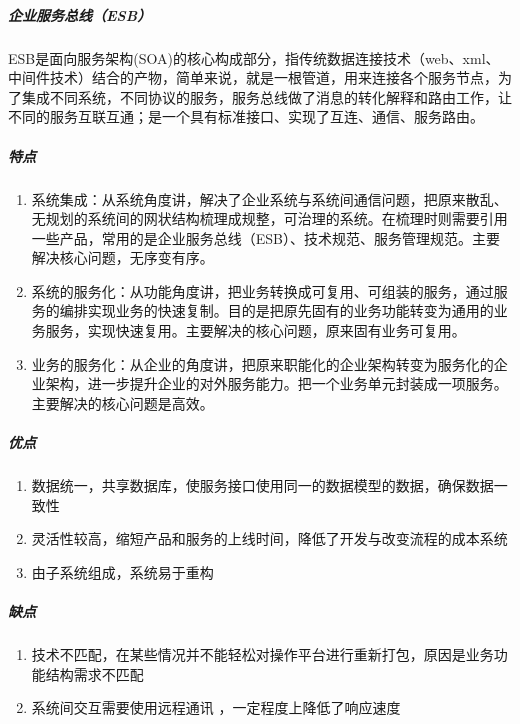 \documentclass[letterpaper,11pt,english]{sphinxmanual}
\begin{document}
\subparagraph{企业服务总线（ESB）}
\label{\detokenize{chapter_idea/understand_tech:esb}}
ESB是面向服务架构(SOA)的核心构成部分，指传统数据连接技术（web、xml、中间件技术）结合的产物，简单来说，就是一根管道，用来连接各个服务节点，为了集成不同系统，不同协议的服务，服务总线做了消息的转化解释和路由工作，让不同的服务互联互通；是一个具有标准接口、实现了互连、通信、服务路由。


\subparagraph{特点}
\label{\detokenize{chapter_idea/understand_tech:id20}}\begin{enumerate}
%
\item {} 
系统集成：从系统角度讲，解决了企业系统与系统间通信问题，把原来散乱、无规划的系统间的网状结构梳理成规整，可治理的系统。在梳理时则需要引用一些产品，常用的是企业服务总线（ESB）、技术规范、服务管理规范。主要解决核心问题，无序变有序。

\item {} 
系统的服务化：从功能角度讲，把业务转换成可复用、可组装的服务，通过服务的编排实现业务的快速复制。目的是把原先固有的业务功能转变为通用的业务服务，实现快速复用。主要解决的核心问题，原来固有业务可复用。

\item {} 
业务的服务化：从企业的角度讲，把原来职能化的企业架构转变为服务化的企业架构，进一步提升企业的对外服务能力。把一个业务单元封装成一项服务。主要解决的核心问题是高效。

\end{enumerate}


\subparagraph{优点}
\label{\detokenize{chapter_idea/understand_tech:id21}}\begin{enumerate}
%
\item {} 
数据统一，共享数据库，使服务接口使用同一的数据模型的数据，确保数据一致性

\item {} 
灵活性较高，缩短产品和服务的上线时间，降低了开发与改变流程的成本系统

\item {} 
由子系统组成，系统易于重构

\end{enumerate}


\subparagraph{缺点}
\label{\detokenize{chapter_idea/understand_tech:id22}}\begin{enumerate}
%
\item {} 
技术不匹配，在某些情况并不能轻松对操作平台进行重新打包，原因是业务功能结构需求不匹配

\item {} 
系统间交互需要使用远程通讯 ，一定程度上降低了响应速度

\end{enumerate}
\end{document}
